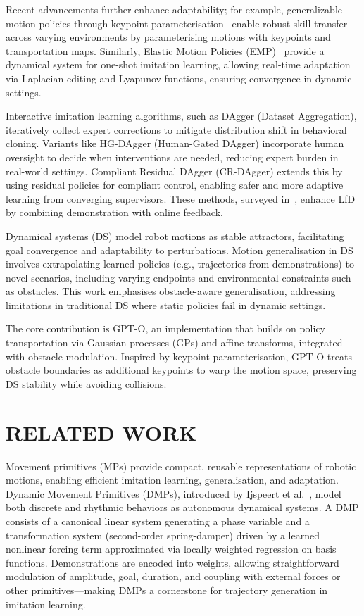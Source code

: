\documentclass[a4paper, 10pt, conference]{ieeeconf}
\begin{document}
Recent advancements further enhance adaptability; for example, generalizable motion policies through keypoint parameterisation~\cite{lee2024generalizable} enable robust skill transfer across varying environments by parameterising motions with keypoints and transportation maps. Similarly, Elastic Motion Policies (EMP)~\cite{li2025elastic} provide a dynamical system for one-shot imitation learning, allowing real-time adaptation via Laplacian editing and Lyapunov functions, ensuring convergence in dynamic settings.

Interactive imitation learning algorithms, such as DAgger (Dataset Aggregation), iteratively collect expert corrections to mitigate distribution shift in behavioral cloning.
Variants like HG-DAgger (Human-Gated DAgger) incorporate human oversight to decide when interventions are needed, reducing expert burden in real-world settings.
Compliant Residual DAgger (CR-DAgger) extends this by using residual policies for compliant control, enabling safer and more adaptive learning from converging supervisors.
These methods, surveyed in~\cite{celemin2022interactive}, enhance LfD by combining demonstration with online feedback.

Dynamical systems (DS) model robot motions as stable attractors, facilitating goal convergence and adaptability to perturbations.
Motion generalisation in DS involves extrapolating learned policies (e.g., trajectories from demonstrations) to novel scenarios, including varying endpoints and environmental constraints such as obstacles.
This work emphasises obstacle-aware generalisation, addressing limitations in traditional DS where static policies fail in dynamic settings.

The core contribution is GPT-O, an implementation that builds on policy transportation via Gaussian processes (GPs) and affine transforms, integrated with obstacle modulation.
Inspired by keypoint parameterisation, GPT-O treats obstacle boundaries as additional keypoints to warp the motion space, preserving DS stability while avoiding collisions.

\section{RELATED WORK}

Movement primitives (MPs) provide compact, reusable representations of robotic motions, enabling efficient imitation learning, generalisation, and adaptation.
Dynamic Movement Primitives (DMPs), introduced by Ijspeert et al.~\cite{Ijspeert2013}, model both discrete and rhythmic behaviors as autonomous dynamical systems.
A DMP consists of a canonical linear system generating a phase variable and a transformation system (second-order spring-damper) driven by a learned nonlinear forcing term approximated via locally weighted regression on basis functions.
Demonstrations are encoded into weights, allowing straightforward modulation of amplitude, goal, duration, and coupling with external forces or other primitives—making DMPs a cornerstone for trajectory generation in imitation learning.
\end{document}
